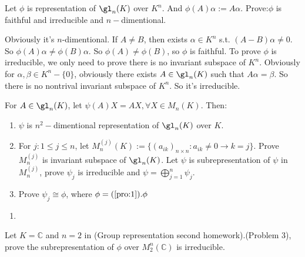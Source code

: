 \documentclass{ctexart}
\newif\ifpreface
\begin{document}
\large
\setlength{\baselineskip}{1.2em}
\ifpreface
  
\else
\maketitle
\fi
{}
\begin{problem}\label{pro:1}
 Let $\phi$ is representation of $\gl_n(K)$ over $K^n$. And $\phi(A)\alpha:=A \alpha$. Prove:$\phi$ is faithful and irreducible and $n-$dimentional. 
\end{problem}
\begin{solution}
 Obviously it's $n$-dimentional. If $A\neq B$, then exists $\alpha\in K^n$ s.t. $(A-B)\alpha\neq 0$. So $\phi(A)\alpha\neq \phi(B)\alpha$. So $\phi(A)\neq \phi(B)$, so $\phi$ is faithful. To prove $\phi$ is irreducible, we only need to prove there is no invariant subspace of $K^n$. Obviously for $\alpha,\beta\in K^n\minus\{0\}$, obviously there exists $A\in \gl_n(K)$ such that $A \alpha=\beta$. So there is no nontrival invariant subspace of $K^n$. So it's irreducible. 
\end{solution}

\begin{problem}
 For $A\in\gl_n(K)$, let $\psi(A)X=AX,\forall X\in M_n(K)$. Then:
 \begin{enumerate}
  \item $\psi$ is $n^2-$dimentional representation of $\gl_n(K)$ over $K$. 
  \item For $j:1\leq j\leq n$, let $M_n^{(j)}(K):=\{(a_{ik})_{n\times n}:a_{ik}\neq 0\to k=j\}$. Prove $M_n^{(j)}$ is invariant subspace of $\gl_n(K)$. Let $\psi$ is subrepresentation of $\psi$ in $M_n^{(j)}$, prove $\psi_j$ is irreducible and $\psi=\bigoplus_{j=1}^n \psi_j$. 
  \item Prove $\psi_j\cong \phi$, where $\phi=(\Cref{pro:1}).\phi$
 \end{enumerate}
\end{problem}

\begin{solution}
 \begin{enumerate}
  \item 
 \end{enumerate}
\end{solution}

\begin{problem}
 Let $K=\mathbb{C}$ and $n=2$ in (Group representation second homework).(Problem 3), prove the subrepresentation of $\phi$ over $M_2^n(\mathbb{C})$ is irreducible.
\end{problem}
\end{document}
